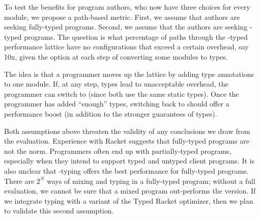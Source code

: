 To test the benefits for program authors, who now have three choices for every
module, we propose a path-based metric.
First, we assume that authors are seeking fully-typed programs.
Second, we assume that the authors are seeking \tdeep{}-typed programs.
The question is what percentage of paths through the \tdeep{}-typed performance
lattice have no configurations that exceed a certain overhead, say 10x, given
the option at each step of converting some modules to \tshallow{} types.

The idea is that a programmer moves up the lattice by adding type annotations
to one module.
If, at any step, \tdeep{} types lead to unacceptable overhead, the programmer can
switch to \tshallow{} (since both use the same static types).
Once the programmer has added ``enough'' types, switching back to \tdeep{} should
offer a performance boost (in addition to the stronger guarantees of \tdeep{} types).

Both assumptions above threaten the validity of any conclusions we draw from the
evaluation.
Experience with Racket suggests that fully-typed programs are not the norm.
Programmers often end up with partially-typed programs, especially when they
intend to support typed and untyped client programs.
It is also unclear that \tdeep{}-typing offers the best performance for fully-typed
programs.
There are $2^N$ ways of mixing \tdeep{} and \tshallow{} typing in a fully-typed program;
 without a full evaluation, we cannot be sure that a mixed program out-performs
 the \tdeep{} version.
If we integrate \tshallow{} typing with a variant of the Typed Racket optimizer,
then we plan to validate this second assumption.
